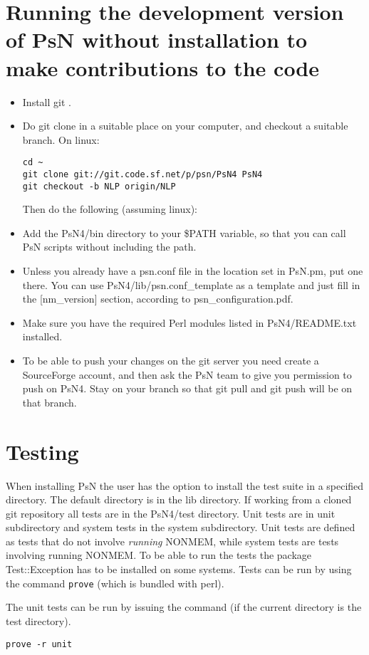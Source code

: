 \section{Running the development version of PsN without installation to make contributions to the code}
\begin{itemize}
\item Install git \cite{git}. 
\item Do git clone in a suitable place on your computer, and checkout a suitable branch. On linux:
\begin{verbatim}
cd ~
git clone git://git.code.sf.net/p/psn/PsN4 PsN4
git checkout -b NLP origin/NLP 

\end{verbatim}
\noindent Then do the following (assuming linux):
\item Add the PsN4/bin directory to your \$PATH variable, so that you can call PsN scripts without including the path.
\item Unless you already have a psn.conf file in the location set in PsN.pm, put one there. 
You can use PsN4/lib/psn.conf\_template as a template and just fill in the [nm\_version] section,
according to psn\_configuration.pdf.
\item Make sure you have the required Perl modules listed in PsN4/README.txt installed.
\item To be able to push your changes on the git server you need create a SourceForge account, 
and then ask the PsN team to give you permission to push on PsN4.
Stay on your branch so that git pull and git push will be on that branch. 
\end{itemize}


\section{Testing}
When installing PsN the user has the option to install the test suite in a specified directory. The default directory is in the lib directory. If working from a cloned git repository all tests are in the PsN4/test directory. Unit tests are in unit subdirectory and system tests in the system subdirectory.  
Unit tests are defined as tests that do not involve \emph{running} NONMEM, while system tests are tests involving running NONMEM.  To be able to run the tests the package Test::Exception has to be installed on some systems.
Tests can be run by using the command \verb|prove| (which is bundled with perl). 

The unit tests can be run by issuing the command (if the current directory is the test directory).
\begin{verbatim}
prove -r unit
\end{verbatim}

